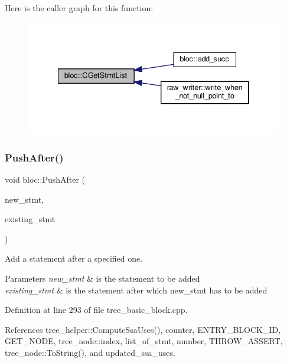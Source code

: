 Here is the caller graph for this function\+:
\nopagebreak
\begin{figure}[H]
\begin{center}
\leavevmode
\includegraphics[width=334pt]{d6/df6/structbloc_a05e3972caa7a3fbfe64eac935c376930_icgraph}
\end{center}
\end{figure}
\mbox{\label{structbloc_a8469a1745da35d47c60c64bedb455d99}} 
\subsubsection{\texorpdfstring{Push\+After()}{PushAfter()}}
{\footnotesize\ttfamily void bloc\+::\+Push\+After (\begin{DoxyParamCaption}\item[{const \hyperlink{tree__node_8hpp_a6ee377554d1c4871ad66a337eaa67fd5}{tree\+\_\+node\+Ref}}]{new\+\_\+stmt,  }\item[{const \hyperlink{tree__node_8hpp_a6ee377554d1c4871ad66a337eaa67fd5}{tree\+\_\+node\+Ref}}]{existing\+\_\+stmt }\end{DoxyParamCaption})}



Add a statement after a specified one. 


\begin{DoxyParams}{Parameters}
{\em new\+\_\+stmt} & is the statement to be added \\
\hline
{\em existing\+\_\+stmt} & is the statement after which new\+\_\+stmt has to be added \\
\hline
\end{DoxyParams}


Definition at line 293 of file tree\+\_\+basic\+\_\+block.\+cpp.



References tree\+\_\+helper\+::\+Compute\+Ssa\+Uses(), counter, E\+N\+T\+R\+Y\+\_\+\+B\+L\+O\+C\+K\+\_\+\+ID, G\+E\+T\+\_\+\+N\+O\+DE, tree\+\_\+node\+::index, list\+\_\+of\+\_\+stmt, number, T\+H\+R\+O\+W\+\_\+\+A\+S\+S\+E\+RT, tree\+\_\+node\+::\+To\+String(), and updated\+\_\+ssa\+\_\+uses.



